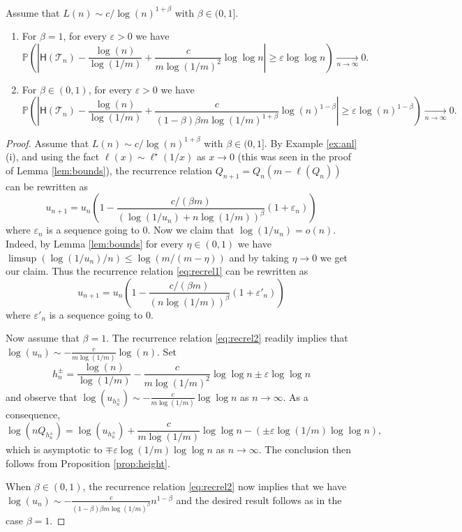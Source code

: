 \documentclass[10pt,a4paper]{amsart}
\DeclareRobustCommand{\P}{\mathbb{P}}
\DeclareRobustCommand{\to}{\xrightarrow[n\rightarrow \infty]{}}
\begin{document}
\begin{proposition}
\label{prop:ex}
Assume that $L(n) \sim c/\log(n)^{1+\beta}$ with $\beta \in (0,1]$.
\begin{enumerate}
\item[(i)] For $\beta=1$, for every $\varepsilon>0$ we have
$$ \P\left( \left| {\mathsf{H}(\mathcal{T}_n)}-  \frac{\log(n)}{\log(1/m)} + \frac{c}{ m \log(1/m)^2} \log \log n \right| \geq \varepsilon \log \log n\right) \to 0.$$
\item[(ii)] For $\beta \in (0,1)$, for every $\varepsilon>0$  we have
$$ \P\left( \left| {\mathsf{H}(\mathcal{T}_n)}-  \frac{\log(n)}{\log(1/m)} + \frac{c}{(1-\beta)\beta m \log(1/m)^{1+\beta}} \log(n)^{1-\beta} \right| \geq \varepsilon \log(n)^{1-\beta} \right) \to 0.$$
\end{enumerate}
\end{proposition}

\begin{proof}
Assume that $L(n) \sim c/\log(n)^{1+\beta}$ with $\beta \in (0,1]$. By Example \ref{ex:anl} (i), and using the fact $\ell(x)\sim\ell^\star(1/x)$ as $x \rightarrow 0$  (this was seen in the proof of Lemma \ref{lem:bounds}), the recurrence relation  $Q_{n+1}=Q_n(m-\ell(Q_n))$ can be rewritten as
\begin{equation}
    \label{eq:recrel1}
u_{n+1}=u_n \left(1- \frac{c/(\beta m)}{\left(\log(1/u_n)+n\log(1/m)\right)^\beta}(1+\varepsilon_n)\right)
\end{equation}
where $\varepsilon_n$ is a sequence going to $0$. Now we claim that $\log(1/u_n)=o(n)$. Indeed, by Lemma \ref{lem:bounds} for every $\eta \in (0,1)$ we have $\limsup ( \log(1/u_n)/n) \leq \log (m/(m-\eta))$ and by taking $\eta \rightarrow 0$ we get our claim. Thus the recurrence relation \eqref{eq:recrel1} can be rewritten as
\begin{equation}
    \label{eq:recrel2}
u_{n+1}=u_n \left(1- \frac{c/(\beta m)}{\left(n\log(1/m)\right)^\beta}(1+\varepsilon'_n)\right)
\end{equation}
where $\varepsilon'_n$ is a sequence going to $0$. 

Now assume that $\beta=1$. The recurrence relation \eqref{eq:recrel2} readily implies that  $\log(u_n) \sim  - \frac{c}{ m \log(1/m)} \log (n)$. Set
$$h^{\pm}_n= \frac{\log(n)}{\log(1/m)} - \frac{c}{ m \log(1/m)^2} \log \log n \pm  \varepsilon \log \log n$$
and observe that $\log(u_{h^\pm_n}) \sim - \frac{c}{ m \log(1/m)} \log \log n$ as $n\rightarrow \infty$. As a consequence,
$$\log \left(n Q_{ h^\pm_{n}}\right) =\log(u_{h^\pm_n}) +  \frac{c}{ m \log(1/m)} \log \log n -(\pm \varepsilon \log(1/m) \log \log n),$$
which is asymptotic to $\mp \varepsilon \log(1/m) \log \log n$ as $n \rightarrow \infty$. 
The conclusion then follows from Proposition \ref{prop:height}.

When $\beta \in (0,1)$, the recurrence relation \eqref{eq:recrel2} now implies that  we have $\log(u_n) \sim  - \frac{c}{(1-\beta)\beta m \log(1/m)^\beta} n^{1-\beta}$ and the desired result follows as in the case $\beta=1$.
\end{proof}
\end{document}
